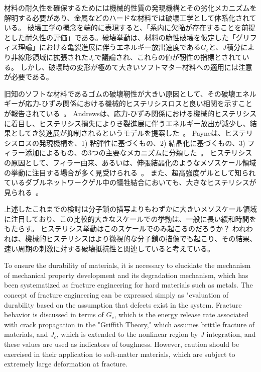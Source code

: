 \documentclass[uplatex,dvipdfmx,a4paper,10pt]{jsarticle}
\makeatletter
\def\subsection{\@startsection{subsection}{2}{\z@}{0.2\Cvs \@plus.5\Cdp \@minus.2\Cdp}{0.1\Cvs \@plus.3\Cdp}{\reset@font\normalsize\bfseries}}
\makeatother
\begin{document}
\subsection{力学的ヒステリシスの重要性}

材料の耐久性を確保するためには機械的性質の発現機構とその劣化メカニズムを解明する必要があり、金属などのハードな材料では破壊工学として体系化されている。
破壊工学の概念を端的に表現すると、「系内に欠陥が存在することを前提とした耐久性の評価」である。破壊挙動は、材料の脆性破壊を仮定した「グリフィス理論」における亀裂進展に伴うエネルギー放出速度である$G_c$と、$J$積分により非線形領域に拡張された$J_c$で議論され、これらの値が靭性の指標とされている。
しかし、破壊時の変形が極めて大きいソフトマター材料への適用には注意が必要である。

旧知のソフトな材料であるゴムの破壊靭性が大きい原因として、その破壊エネルギーが応力-ひずみ関係における機械的ヒステリシスロスと良い相関を示すことが報告されている~\cite{payne1}。
Andrewsは、応力-ひずみ関係における機械的ヒステリシスに着目し、ヒステリシス損失によりき裂進展に伴うエネルギー放出が減少し、結果としてき裂進展が抑制されるというモデルを提案した~\cite{Andrews}。
Payneは、ヒステリシスロスの発現機構を、1) 粘弾性に基づくもの、2) 結晶化に基づくもの、3) フィラー添加によるもの、の3つの主要なメカニズムに分類した~\cite{payne2}。
ヒステリシスの原因として、フィラー由来、あるいは、伸張結晶化のようなメゾスケール領域の挙動に注目する場合が多く見受けられる~\cite{zhang, Igarashi2013}。
また、超高強度ゲルとして知られているダブルネットワークゲル中の犠牲結合においても、大きなヒステリシスが見られる~\cite{Gong2010}。

上述したこれまでの検討は分子鎖の描写よりもわずかに大きいメソスケール領域に注目しており、この比較的大きなスケールでの挙動は、一般に長い緩和時間をもたらす。
ヒステリシス挙動はこのスケールでのみ起こるのだろうか？
われわれは、機械的ヒステリシスはより微視的な分子鎖の描像でも起こり、その結果、速い周期の刺激に対する破壊抵抗性と関連していると考えている。



To ensure the durability of materials, it is necessary to elucidate the mechanism of mechanical property development and its degradation mechanism, which has been systematized as fracture engineering for hard materials such as metals.
The concept of fracture engineering can be expressed simply as "evaluation of durability based on the assumption that defects exist in the system. Fracture behavior is discussed in terms of $G_c$, which is the energy release rate associated with crack propagation in the "Griffith Theory," which assumes brittle fracture of materials, and $J_c$, which is extended to the nonlinear region by $J$ integration, and these values are used as indicators of toughness.
However, caution should be exercised in their application to soft-matter materials, which are subject to extremely large deformation at fracture.
\end{document}
